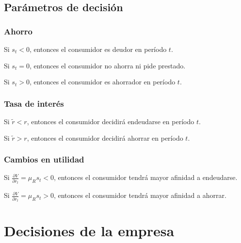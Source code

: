 \documentclass[8pt,a4paper]{extarticle}
\begin{document}
\begin{multicols}{3}
\begin{boxtheo}
	\end{boxtheo}

	\subsection{Parámetros de decisión}

	\subsubsection*{Ahorro}

	\begin{eqlist}
		\item Si $s_t < 0$, entonces el consumidor es deudor en período $t$.
		\item Si $s_t = 0$, entonces el consumidor no ahorra ni pide prestado.
		\item Si $s_t > 0$, entonces el consumidor es ahorrador en período $t$.
	\end{eqlist}

	\subsubsection*{Tasa de interés}

	\begin{eqlist}
		\item Si $ \tilde{r} < r $, entonces el consumidor decidirá endeudarse en período $t$.
		\item Si $ \tilde{r} > r $, entonces el consumidor decidirá ahorrar en período $t$.
	\end{eqlist}

	\subsubsection*{Cambios en utilidad}

	\begin{eqlist}
		\item Si $\displaystyle \frac{\partial V}{\partial r_t} = \mu_R s_t < 0$, entonces el consumidor tendrá mayor afinidad a endeudarse.
		\item Si $\displaystyle \frac{\partial V}{\partial r_t} = \mu_R s_t > 0$, entonces el consumidor tendrá mayor afinidad a ahorrar.
	\end{eqlist}

	\newpage

	\section{Decisiones de la empresa}


\end{multicols}
\end{document}
